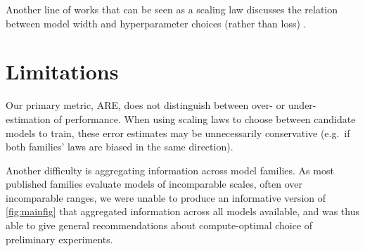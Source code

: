 \documentclass{article}
\theoremstyle{plain}
\theoremstyle{definition}
\theoremstyle{remark}
\begin{document}
Another line of works that can be seen as a scaling law discusses the relation between model width and hyperparameter choices (rather than loss) \citep{yang2022tensor,yang2021tuning,blake2024u,lingle2024large}.


\section{Limitations}\label{sec:limitations}
Our primary metric, ARE, does not distinguish between over- or under-estimation of performance. When using scaling laws to choose between candidate models to train, these error estimates may be unnecessarily conservative (e.g.\ if both families' laws are biased in the same direction).



Another difficulty is aggregating information across model families. As most published families evaluate models of incomparable scales, often over incomparable ranges, we were unable to produce an informative version of \cref{fig:mainfig} that aggregated information across all models available, and was thus able to give general recommendations about compute-optimal choice of preliminary experiments.

\end{document}
